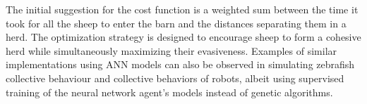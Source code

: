 \documentclass[9pt]{pnas-new}
\begin{document}
The initial suggestion for the cost function is a weighted sum between the time it took for all the sheep to enter the barn and the distances separating them in a herd. The optimization strategy is designed to encourage sheep to form a cohesive herd while simultaneously maximizing their evasiveness. Examples of similar implementations using ANN models can also be observed in simulating zebrafish collective behaviour\cite{7496361} and collective behaviors of robots\cite{cazenille2018modelling}, albeit using supervised training of the neural network agent's models instead of genetic algorithms. 

\showacknow %


\begin{multicols}{2}
\section*{\bibname}

\end{multicols}
\end{document}
